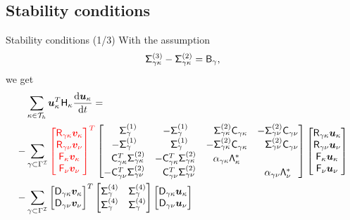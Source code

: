 \documentclass{beamer}
\begin{document}
\subsection{Stability conditions}
\begin{frame} {Stability conditions (1/3)}
    With the assumption
    \begin{equation*}
    \mathsf{\Sigma}_{\gamma\kappa}^{(3)} - \mathsf{\Sigma}_{\gamma\kappa}^{(2)} = \mathsf{B}_{\gamma},
    \end{equation*}
    we get
    \small
    \begin{equation*}
    \begin{aligned}
     &\sum_{\kappa\in \fnc{T}_h}\Ukp^T \Hk \frac{\diff \Ukp}{\diff t} = \\
    -& \sum_{\gamma \subset \Gamma^{\fnc{I}}}
    {\color{red}\begin{bmatrix} \Rgk \Vkp \\ \Rgn \Vnu \\ \Gk \Vkp \\ \Gn \Vnu
    \end{bmatrix}^{T}} 
    \setlength{\arraycolsep}{5pt}
    \begin{bmatrix} 
    \phnt{-}\Siggam{1} & -\Siggam{1} & \phnt{-}\Siggk{2} \Cgk & -\Siggn{2}\Cgn \\
    -\Siggam{1} & \phnt{-}\Siggam{1} & -\Siggk{2}\Cgk & \phnt{-}\Siggn{2}\Cgn \\
    \phnt{-}\Cgk^T\Siggk{2} & -\Cgk^{T}\Siggk{2} & \alpha_{\gamma \kappa}\Lam_{\kappa}^{*} &  \\
    -\Cgn^T\Siggn{2} & \phnt{-}\Cgn^{T}\Siggn{2} &  & \alpha_{\gamma \nu} \Lam_{\nu}^{*}   
    \end{bmatrix}
    \begin{bmatrix} \Rgk \Ukp \\ \Rgn \Unu \\ \Gk \Ukp \\ \Gn \Unu
    \end{bmatrix} \\
    -& \sum_{\gamma \subset \Gamma^{\fnc{I}}}
    \begin{bmatrix} \Dgk \Vkp \\ \Dgn \Vnu \end{bmatrix}^T
    \begin{bmatrix} \Siggam{4} & \Siggam{4} \\ \Siggam{4} & \Siggam{4} \end{bmatrix}
    \begin{bmatrix} \Dgk \Ukp \\ \Dgn \Unu \end{bmatrix} \\

\end{aligned}
\end{equation*}
\end{frame}
\end{document}
